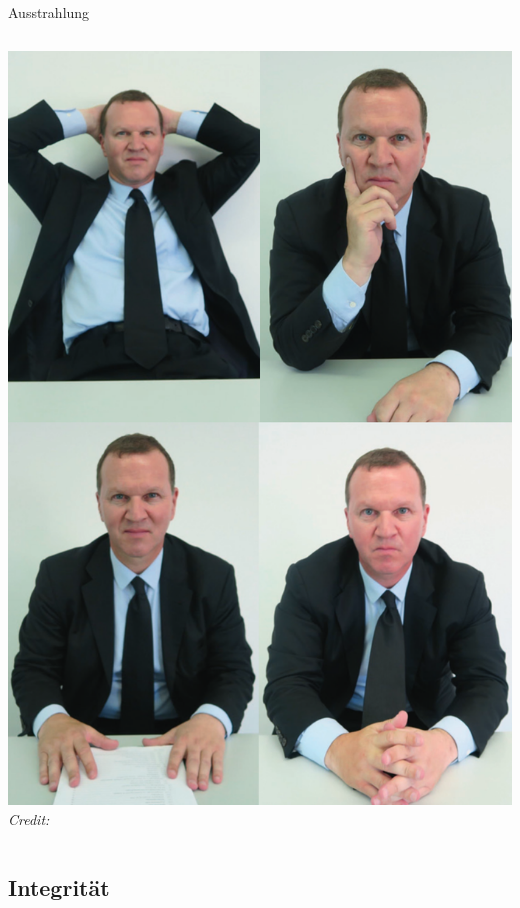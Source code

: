 \begin{frame}{Ausstrahlung}
\begin{columns}[c]
\begin{column}{0.35\textwidth}
      \includegraphics[width=\textwidth]{content/fig/nonverbal.png}
      {\hspace*{15pt}\hbox{\scriptsize\itshape Credit:}}
    \end{column}
  \end{columns}

\end{frame}


\subsection{Integrität}

